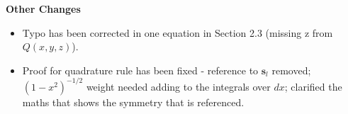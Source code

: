 \documentclass[10pt]{letter}
\begin{document}
\bigskip

\centerline{\textbf{Other Changes}}

\begin{itemize}[parsep=1em,leftmargin=1em]
	\item Typo has been corrected in one equation in Section 2.3 (missing z from $Q(x,y,z)$).
	\item Proof for quadrature rule has been fixed - reference to $\bm{s}_l$ removed; $(1-x^2)^{-1/2}$ weight needed adding to the integrals over $dx$; clarified the maths that shows the symmetry that is referenced.
\end{itemize}
\end{document}
